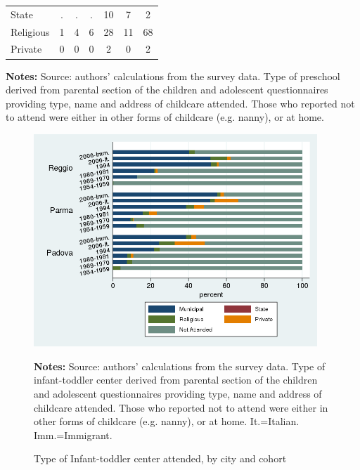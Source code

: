 \documentclass[12pt]{article}
\begin{document}
\begin{table}[ht]
\begin{center}
\begin{tabular}{l ccc|ccc}
State           &   . &   . &   . &  10 &   7 &   2 \\ 
Religious       &   1 &   4 &   6 &  28 &  11 &  68 \\ 
Private         &   0 &   0 &   0 &   2 &   0 &   2 \\ \hline
\end{tabular}
\end{center}
\raggedright{\footnotesize {{\bfseries Notes:} Source: authors' calculations from  the survey data. Type of preschool derived from parental section of the children and adolescent questionnaires providing type, name and address of childcare attended. Those who reported not to attend were either in other forms of childcare (e.g. nanny), or at home.} }
\end{table}











\begin{figure}[!htb]
\caption{Type of Infant-toddler center attended, by city and cohort}
\label{fig:asiloAttend}
\begin{center}
\includegraphics[height=8cm]{asiloType-Attend.png} \\[0pt]
\end{center}
\par
{\footnotesize {{\bfseries Notes:} Source: authors' calculations from the survey data. Type of infant-toddler center derived from parental section of the children and adolescent questionnaires providing type, name and address of childcare attended. Those who reported not to attend were either in other forms of childcare (e.g. nanny), or at home. It.=Italian. Imm.=Immigrant.} }
\end{figure}
\end{document}
